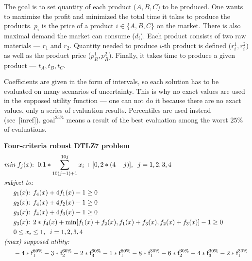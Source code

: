 \begin{description}
    The goal is to set quantity of each product ($A, B, C$) to be
    produced. One wants to maximize the profit and minimized the total time it
    takes to produce the products. $p_i$ is the price of a product $i \in \{A,
    B, C\}$ on the market. There is also maximal demand the market can consume
    ($d_i$). Each product consists of two raw materials --- $r_1$ and
    $r_2$. Quantity needed to produce $i$-th product is defined ($r^1_i,
    r^2_i$) as well as the product price ($p^1_R, p^2_R$). Finally, it takes
    time to produce a given product --- $t_A, t_B, t_C$.

    Coefficients are given in the form of intervals, so each solution has to
    be evaluated on many scenarios of uncertainty. This is why no exact values
    are used in the supposed utility function --- one can not do it because
    there are no exact values, only a series of evaluation
    results. Percentiles are used instead (see~[inref]). $\text{goal}^{25\%}$
    means a result of the best evaluation among the worst $25\%$ of
    evaluations.

  \item{\textbf{Four-criteria robust DTLZ7 problem}}
    \begin{align*}
      & \textit{min}\text{ $f_j(x)$:} \hspace{0.2cm}
      0.1 * \sum_{10(j-1) + 1}^{10j}x_i + [0, 2*(4-j)], \hspace{0.2cm}
      j = 1, 2, 3, 4\\
      & \textit{subject to:} \\
      & \hspace{0.5cm} g_1(x)\text{: } f_4(x) + 4f_1(x) - 1 \ge 0\\
      & \hspace{0.5cm} g_2(x)\text{: } f_4(x) + 4f_2(x) - 1 \ge 0\\
      & \hspace{0.5cm} g_3(x)\text{: } f_4(x) + 4f_3(x) - 1 \ge 0\\
      & \hspace{0.5cm} g_3(x)\text{: } 2*f_4(x) + \text{min}
      [f_1(x) + f_2(x), f_1(x) + f_3(x), f_2(x) + f_3(x)] -1 \ge 0\\
      & \hspace{0.5cm} 0 \le x_i \le 1, \hspace{0.2cm} i = 1, 2, 3, 4 \\
      & \textit{(max) supposed utility:} \\
      & \hspace{0.5cm} -4 * \text{f}_1^{60\%} -3 * \text{f}_2^{60\%}
      -2 * \text{f}_3^{60\%} -1 * \text{f}_1^{60\%}
      -8 * \text{f}_1^{30\%} -6 * \text{f}_2^{30\%}
      -4 * \text{f}_3^{30\%} -2 * \text{f}_1^{30\%}
    \end{align*}


\end{description}
